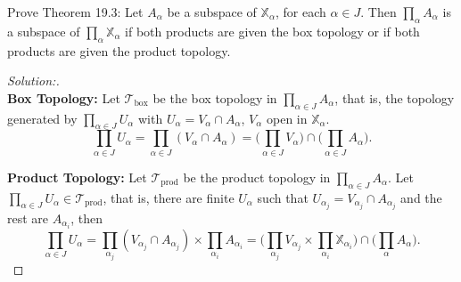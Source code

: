 \documentclass[a4paper,12pt, reqno]{article}
\theoremstyle{definition}
\newenvironment{exerr}[1]{
  \renewcommand\theexeralt{#1}
  \exeralt
}{\endexeralt}
\newenvironment{solution}{\begin{proof}[Solution:]}{\end{proof}}
\newcommand{\T}{\mathscr{T}}
\newcommand{\X}{\mathbb{X}}
\begin{document}
\begin{exerr}{2}
  Prove Theorem 19.3: Let $A_{\alpha}$ be a subspace of $\X_{\alpha}$, for each $\alpha\in J$. Then $\prod_{\alpha}A_{\alpha}$ is a subspace of $\prod_{\alpha}\X_{\alpha}$ if both products are given the box topology or if both products are given the product topology.
\end{exerr}
\begin{solution}\hfill\\

  \noindent\textbf{Box Topology:} Let $\T_{\text{box}}$ be the box topology in $\prod_{\alpha\in J}A_{\alpha}$, that is, the topology generated by $\prod_{\alpha\in J}U_{\alpha}$ with $U_{\alpha}=V_{\alpha}\cap A_{\alpha}$, $V_{\alpha}$ open in $\X_{\alpha}$.
  \begin{equation*}
    \prod_{\alpha\in J}U_{\alpha} = \prod_{\alpha\in J}(V_{\alpha}\cap A_{\alpha}) = \Big( \prod_{\alpha\in J}V_{\alpha} \Big)\cap \Big( \prod_{\alpha\in J}A_{\alpha} \Big).
  \end{equation*}

  \noindent\textbf{Product Topology:} Let $\T_{\text{prod}}$ be the product topology in $\prod_{\alpha\in J}A_{\alpha}$. Let $\prod_{\alpha\in J}U_{\alpha}\in\T_{\text{prod}}$, that is, there are finite $U_{\alpha}$ such that $U_{\alpha_j} = V_{\alpha_{j}}\cap A_{\alpha_{j}}$ and the rest are $A_{\alpha_{i}}$, then
  \begin{equation*}
    \prod_{\alpha\in J} U_{\alpha} = \prod_{\alpha_{j}}(V_{\alpha_{j}}\cap A_{\alpha_{j}})\times \prod_{\alpha_{i}}A_{\alpha_{i}} = \Big( \prod_{\alpha_{j}}V_{\alpha_{j}}\times\prod_{\alpha_{i}}\X_{\alpha_{i}} \Big)\cap \Big( \prod_{\alpha}A_{\alpha} \Big).
  \end{equation*}
\end{solution}
\end{document}
